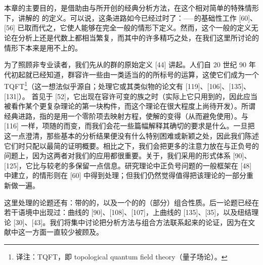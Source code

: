 \part{\trFukayaCategory}
本章的主要目的，是借助由\trGromov{}与\trFloer{}所开创的经典分析方法，在\trExactSymplectic\trManifold{}这个相对简单的特殊情形下，讲解\trFukaya{}的 \trACategory{}的定义。可以说，这条进路如今已经过时了：\trFukaya--\trOh--\trOhta--\trOno{}的基础性工作 [60]、[56] 已取而代之，它使人能够在完全一般的情形下定义\trFukayaCategory。然而，这个一般的定义无论在分析上还是代数上都相当繁复，而其中的许多精巧之处，在我们这里所讨论的情形下本来是用不上的。

为了照顾非专业读者，我们先从\trExact\trLagrange\trSubmanifold{}的\trFloerCohomology{}群的原始定义 [44] 讲起。人们自 20 世纪 90 年代初起就已经知道，\trFloer{}群容许一些由一类适当的\trPointedBoundary{}的\trRiemann\trSurface{}所标号的运算，这使它们成为一个\trOpenString{} TQFT\footnote{译注：TQFT，即 topological quantum field theory（\trTopology{}量子场论）。}（这一想法似乎源自\trDonaldson；处理它或其\trClosedString{}类似物的论文有 [119]、[106]、[135]、[131]）。\trFukaya{} \trACategory{}首见于 [52]，它出现在容许\trComplexStructure{}可变的\trRiemann\trSurface{}族之时（实际上它只用到\trPointedBoundary{}的\trDisk，因此应当被看作某个更复杂理论的第一块构件，而这个理论在很大程度上尚待开发）。所谓经典进路，指的是用一个零阶\trInhomogeneous{}项去\trPerturbation{}\trPseudoholomorphic{}映射方程，使解的\trModuliSpace{}变得\trSmooth（从而避免使用\trVirtualFundamentalChain）。与 [116] 一样，\trInhomogeneous{}项随\trRiemann\trSurface{}的\trComplexStructure{}而变，而我们会花一些篇幅解释其确切的要求是什么。一旦把这一点澄清，那些基本的分析结果便没有什么特别困难或新颖之处，因此我们陈述它们时只配以最简的证明概要。相比之下，我们会把更多的注意力放在\trGrading{}与正负号的问题上，因为这两者对我们的应用都很重要。关于\trGrading，我们采用\trKontsevich{}的\trGraded\trLagrange\trSubmanifold{}形式体系 [90]、[125]，它比\trFloer{}与\trViterbo{}较老的\trRelative{}\trGrading{}多保留一点信息。研究\trFloer{}理论中正负号问题的一般框架在 [48] 中建立，\trLagrange{}\trFloerCohomology{}的情形则在 [60] 中得到处理；但我们仍然觉得值得把该理论的一部分重新做一遍。

这里处理的论题还有：带\trInvolution{}的\trSymplectic\trManifold{}的\trEquivariant{}\trFukayaCategory，以及一个\trSurface{}的\trFukayaCategory{}的（部分）组合性质。后一论题已经在若干语境中出现过：\trElliptic{}曲线的\trHomology\trMirrorSymmetry{} [90]、[108]、[107]，\trSurface{}上曲线的\trFloerHomology{} [135]、[35]，以及\trLegendrian{}纽结理论 [30]、[43]。我们将集中讨论把分析方法与组合方法联系起来的\trRegularity{}论证，因为在文献中这一方面一直较少被顾及。
